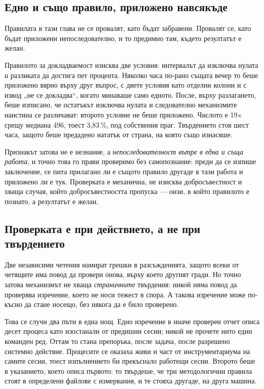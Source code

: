 \subsection{Едно и също правило, приложено навсякъде}

Правилата в тази глава не се провалят, като бъдат забравени. Провалят се, като бъдат приложени
непоследователно, и то предимно там, където резултатът е желан.

Правилото за докладваемост изисква две условия: интервалът да изключва нулата \emph{и} разликата да
достига пет процента. Няколко часа по-рано същата вечер то беше приложено вярно върху друг въпрос, с
двете условия като отделни колони и с извод „не се докладва“, когато минаваше само едното. После, върху
разлагането, беше изписано, че остатъкът изключва нулата и следователно механизмите наистина се
различават: второто условие не беше приложено. Числото е 19\,\textmu s срещу медиана 496, тоест 3,83\,\%,
под собствения праг. Твърдението стоя шест часа, защото беше предадено нататък от страна, на която
също изнасяше.

Признакът затова не е незнание, а \emph{непоследователност вътре в една и съща работа}, и точно това
го прави проверимо без самопознание: преди да се изпише заключение, се пита прилагано ли е същото
правило другаде в тази работа и приложено ли е тук. Проверката е механична, не изисква добросъвестност
и хваща случая, който добросъвестността пропуска — онзи, в който правилото е познато, а резултатът е
желан.

\subsection{Проверката е при действието, а не при твърдението}

Две независими четения намират грешки в разсъжденията, защото всеки от четящите има повод да
провери онова, върху което другият гради. Но точно затова механизмът не хваща \emph{страничните}
твърдения: никой няма повод да проверява изречение, което не носи тежест в спора. А такова изречение
може по-късно да стане носещо, без някога да е било проверено.

Това се случи два пъти в една нощ. Едно изречение в иначе проверен отчет описа десет процеса като
изостанали от предишни сесии; никой не прочете нито един команден ред. Оттам то стана препоръка, после
задача, после разрешено системно действие. Процесите се оказаха живи и част от инструментариума на
самите сесии, тоест изпълнението би прекъснало работещи сесии. Второто беше в указанието, което описа
първото: то твърдеше, че три методологични правила стоят в определени файлове с измервания, и те
стояха другаде, на друга машина.

